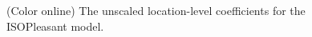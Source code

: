 \documentclass[
  authoryear,
  preprint,
  3p,
  onecolumn]{elsarticle}
\begin{document}
\begin{figure}


\caption{\label{fig-unsclRandom}(Color online) The unscaled
location-level coefficients for the ISOPleasant model.}

\end{figure}%


\renewcommand\refname{References}
  
\end{document}
